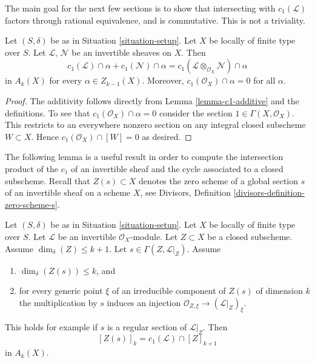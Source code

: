 \medskip\noindent
The main goal for the next few sections is to show that intersecting with
$c_1(\mathcal{L})$ factors through rational equivalence, and is commutative.
This is not a triviality.

\begin{lemma}
\label{lemma-c1-cap-additive}
Let $(S, \delta)$ be as in Situation \ref{situation-setup}.
Let $X$ be locally of finite type over $S$.
Let $\mathcal{L}$, $\mathcal{N}$ be an invertible sheaves on $X$.
Then
$$
c_1(\mathcal{L}) \cap \alpha  + c_1(\mathcal{N}) \cap \alpha =
c_1(\mathcal{L} \otimes_{\mathcal{O}_X} \mathcal{N}) \cap \alpha
$$
in $A_k(X)$ for every $\alpha \in Z_{k - 1}(X)$. Moreover,
$c_1(\mathcal{O}_X) \cap \alpha = 0$ for all $\alpha$.
\end{lemma}

\begin{proof}
The additivity follows directly from Lemma \ref{lemma-c1-additive}
and the definitions. To see that $c_1(\mathcal{O}_X) \cap \alpha = 0$
consider the section $1 \in \Gamma(X, \mathcal{O}_X)$. This restricts
to an everywhere nonzero section on any integral closed subscheme
$W \subset X$. Hence $c_1(\mathcal{O}_X) \cap [W] = 0$ as desired.
\end{proof}

\noindent
The following lemma is a useful result in order to compute the intersection
product of the $c_1$ of an invertible sheaf and the cycle associated
to a closed subscheme.
Recall that $Z(s) \subset X$ denotes the zero scheme of a global section
$s$ of an invertible sheaf on a scheme $X$, see
Divisors, Definition \ref{divisors-definition-zero-scheme-s}.

\begin{lemma}
\label{lemma-geometric-cap}
Let $(S, \delta)$ be as in Situation \ref{situation-setup}.
Let $X$ be locally of finite type over $S$.
Let $\mathcal{L}$ be an invertible $\mathcal{O}_X$-module.
Let $Z \subset X$ be a closed subscheme.
Assume $\dim_\delta(Z) \leq k + 1$.
Let $s \in \Gamma(Z, \mathcal{L}|_Z)$.
Assume
\begin{enumerate}
\item $\dim_\delta(Z(s)) \leq k$, and
\item for every generic point $\xi$ of an irreducible component of
$Z(s)$ of dimension $k$ the multiplication by $s$
induces an injection $\mathcal{O}_{Z, \xi} \to (\mathcal{L}|_Z)_\xi$.
\end{enumerate}
This holds for example if $s$ is a regular section of $\mathcal{L}|_Z$.
Then
$$
[Z(s)]_k = c_1(\mathcal{L}) \cap [Z]_{k + 1}
$$
in $A_k(X)$.
\end{lemma}


